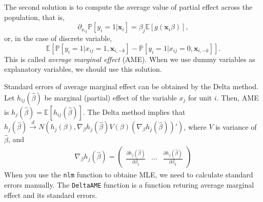 \documentclass[
  12pt,
]{article}
\begin{document}
The second solution is to compute the average value of partial effect
across the population, that is, \begin{equation*}
  \partial_{x_{ij}} \mathbb{P}[y_i = 1 | \mathbf{x}_i] = \beta_j \mathbb{E}[g(\mathbf{x}_i \beta)],
\end{equation*} or, in the case of discrete variable, \begin{equation*}
  \mathbb{E}[ \mathbb{P}[y_i = 1 | x_{ij} = 1, \mathbf{x}_{i,-k}] - \mathbb{P}[y_i = 1 | x_{ij} = 0, \mathbf{x}_{i,-k}] ].
\end{equation*} This is called \emph{average marginal effect} (AME).
When we use dummy variables as explanatory variables, we should use this
solution.

Standard errors of average marginal effect can be obtained by the Delta
method. Let \(h_{ij}(\hat{\beta})\) be marginal (partial) effect of the
variable \(x_j\) for unit \(i\). Then, AME is
\(h_j(\hat{\beta}) = \mathbb{E}[h_{ij}(\hat{\beta})]\). The Delta method
implies that
\(h_j(\hat{\beta}) \overset{d}{\to} N(h_j(\beta), \nabla_{\beta} h_j(\hat{\beta}) V(\beta) (\nabla_{\beta} h_j(\hat{\beta}))')\),
where \(V\) is variance of \(\hat{\beta}\), and \begin{align*}
  \nabla_{\beta} h_j(\hat{\beta}) =
  \begin{pmatrix}
    \frac{\partial h_j(\hat{\beta})}{\partial \beta_1} & \cdots & \frac{\partial h_j(\hat{\beta})}{\partial \beta_k}
  \end{pmatrix}
\end{align*} When you use the \texttt{nlm} function to obtaine MLE, we
need to calculate standard errors manually. The \texttt{DeltaAME}
function is a function returing average marginal effect and its standard
errors.
\end{document}
